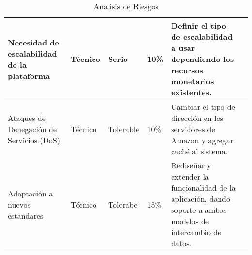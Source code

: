 \begin{table}[b!]
\begin{tabular}{|p{3cm}|lllll}
        \hline
          \multicolumn{1}{|p{3cm}|}{Necesidad de escalabilidad de la plataforma} & 
          \multicolumn{1}{p{2cm}|}{Técnico} & 
          \multicolumn{1}{p{2cm}|}{Serio} & 
          \multicolumn{1}{p{2cm}|}{10\%} & 
          \multicolumn{1}{p{5cm}|}{Definir el tipo de escalabilidad a usar dependiendo los recursos monetarios existentes.} \\ 
        \hline
          \multicolumn{1}{|p{3cm}|}{Ataques de Denegación de Servicios (DoS)} & 
          \multicolumn{1}{p{2cm}|}{Técnico} & 
          \multicolumn{1}{p{2cm}|}{Tolerable} & 
          \multicolumn{1}{p{2cm}|}{10\%} & 
          \multicolumn{1}{p{5cm}|}{Cambiar el tipo de dirección en los servidores de Amazon y agregar caché al sistema.} \\ 
        \hline
          \multicolumn{1}{|p{3cm}|}{Adaptación a nuevos estandares} &
          \multicolumn{1}{p{2cm}|}{Técnico} &
          \multicolumn{1}{p{2cm}|}{Tolerabe} &
          \multicolumn{1}{p{2cm}|}{15\%} &
          \multicolumn{1}{p{5cm}|}{Rediseñar y extender la funcionalidad de la aplicación, dando soporte a ambos modelos de intercambio de datos.} \\ 
        \hline
      \end{tabular}
      \caption{Analisis de Riesgos}
      \label{Analisis de riesgos}
    \end{table}
    \clearpage
\fi